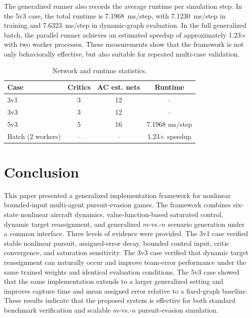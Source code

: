 ﻿\documentclass[conference]{IEEEtran}
\begin{document}
The generalized runner also records the average runtime per simulation step. In the 5v3 case, the total runtime is 7.1968~ms/step, with 7.1230~ms/step in training and 7.6323~ms/step in dynamic-graph evaluation. In the full generalized batch, the parallel runner achieves an estimated speedup of approximately 1.23$\times$ with two worker processes. These measurements show that the framework is not only behaviorally effective, but also suitable for repeated multi-case validation.

\begin{table}[t]
\caption{Network and runtime statistics.}
\label{tab:runtime}
\centering
\small
\begin{tabular}{lccc}
\toprule
Case & Critics & AC est. nets & Runtime \\
\midrule
3v1 & 3 & 12 & -- \\
3v3 & 3 & 12 & -- \\
5v3 & 5 & 16 & 7.1968 ms/step \\
Batch (2 workers) & -- & -- & 1.23$\times$ speedup \\
\bottomrule
\end{tabular}
\end{table}

\section{Conclusion}
This paper presented a generalized implementation framework for nonlinear bounded-input multi-agent pursuit-evasion games. The framework combines six-state nonlinear aircraft dynamics, value-function-based saturated control, dynamic target reassignment, and generalized $m$-vs.-$n$ scenario generation under a common interface. Three levels of evidence were provided. The 3v1 case verified stable nonlinear pursuit, assigned-error decay, bounded control input, critic convergence, and saturation sensitivity. The 3v3 case verified that dynamic target reassignment can naturally occur and improve team-error performance under the same trained weights and identical evaluation conditions. The 5v3 case showed that the same implementation extends to a larger generalized setting and improves capture time and mean assigned error relative to a fixed-graph baseline. These results indicate that the proposed system is effective for both standard benchmark verification and scalable $m$-vs.-$n$ pursuit-evasion simulation.



\end{document}
